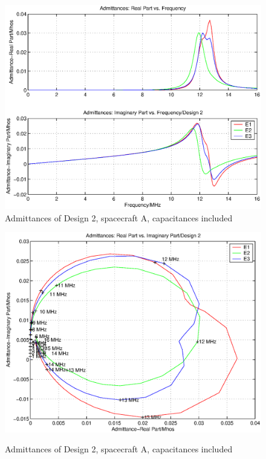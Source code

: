 \documentclass[a4paper,10pt]{thesis}
\begin{document}
\begin{figure}
\begin{center}
\includegraphics[scale=0.65]{AdmittancesD21_caps.eps}\\
\caption{Admittances of Design 2, spacecraft A, capacitances included} \label{fig_Admittance1_D2_caps}
\includegraphics[scale=0.65]{AdmittancesD22_caps.eps} \\
\caption{Admittances of Design 2, spacecraft A, capacitances included} \label{fig_Admittance2_D2_caps}
\end{center}
\end{figure}
\end{document}
